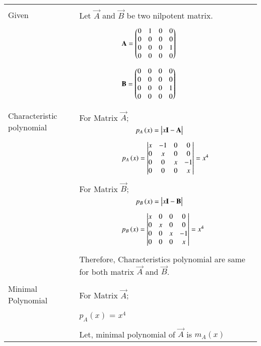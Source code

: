 \onecolumn
\begin{longtable}{|p{5cm}|p{13cm}|}
    \hline
    \multirow{3}{*}{Given} 
    &\\
    & Let $\vec{A}$ and $\vec{B}$ be two nilpotent matrix.\\
    &\\
    &$\qquad\qquad\qquad \mathbf{A}=\begin{pmatrix}0&1&0&0\\0&0&0&0\\0&0&0&1\\0&0&0&0\end{pmatrix}$\\
    &\\
    &$\qquad\qquad\qquad\mathbf{B}=\begin{pmatrix}0&0&0&0\\0&0&0&0\\0&0&0&1\\0&0&0&0\end{pmatrix}$\\
    &\\
    \hline
	\multirow{3}{*}{Characteristic polynomial} 
	& \\
	& For Matrix $\vec{A}$;\\
	& $\qquad\qquad\qquad\qquad p_A\brak{x}=\mydet{x\Vec{I}-\Vec{A}}$\\
	&\\
	& $\qquad\qquad\qquad p_A\left(x\right)=\begin{vmatrix}x&-1&0&0\\0&x&0&0\\0&0&x&-1\\0&0&0&x\end{vmatrix} = x^4$\\
	&\\
	& For Matrix $\vec{B}$; \\
	& $\qquad\qquad\qquad\qquad p_B\brak{x}=\mydet{x\Vec{I}-\Vec{B}}$\\
	&\\
	& $\qquad\qquad\qquad p_B\left(x\right)= \begin{vmatrix}x&0&0&0\\0&x&0&0\\0&0&x&-1\\0&0&0&x\end{vmatrix} = x^4$\\
	&\\
	& Therefore, Characteristics polynomial are same for both matrix $\vec{A}$ and $\vec{B}$.\\
	&\\
	\hline
	\multirow{3}{*}{Minimal Polynomial} & \\
	& For Matrix $\vec{A}$;\\
	&\\
    & $p_A(x)$ = $x^4$ \\
    &\\
    & Let, minimal polynomial of $\vec{A}$ is $m_A(x)$\\

\end{longtable}
